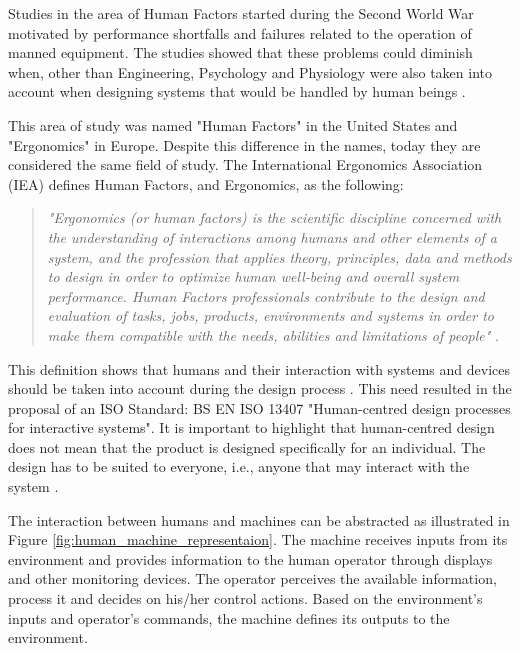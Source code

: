 Studies in the area of Human Factors started during the Second World War motivated by performance shortfalls and failures related to the operation of manned equipment. The studies showed that these problems could diminish when, other than Engineering, Psychology and Physiology were also taken into account when designing systems that would be handled by human beings \cite{sandom2004human}.

This area of study was named "Human Factors" in the United States and "Ergonomics" in Europe. Despite this difference in the names, today they are considered the same field of study. The International Ergonomics Association (IEA) defines Human Factors, and Ergonomics, as the following:

\begin{quote}
    \textit{"Ergonomics (or human factors) is the scientific discipline concerned with the understanding of interactions among humans and other elements of a system, and the profession that applies theory, principles, data and methods to design in order to optimize human well-being and overall system performance. Human Factors professionals contribute to the design and evaluation of tasks, jobs, products, environments and systems in order to make them compatible with the needs, abilities and limitations of people"} \cite{karwowski2012discipline}.
\end{quote}

This definition shows that humans and their interaction with systems and devices should be taken into account during the design process \cite{sandom2004human, sanders1998human, dul2003ergonomics}. This need resulted in the proposal of an ISO Standard: BS EN ISO 13407 "Human-centred design processes for interactive systems". It is important to highlight that human-centred design does not mean that the product is designed specifically for an individual. The design has to be suited to everyone, i.e., anyone that may interact with the system \cite{dul2003ergonomics}.

The interaction between humans and machines can be abstracted as illustrated in Figure \ref{fig:human_machine_representaion}. The machine receives inputs from its environment and provides information to the human operator through displays and other monitoring devices. The operator perceives the available information, process it and decides on his/her control actions. Based on the environment's inputs and operator's commands, the machine defines its outputs to the environment.



